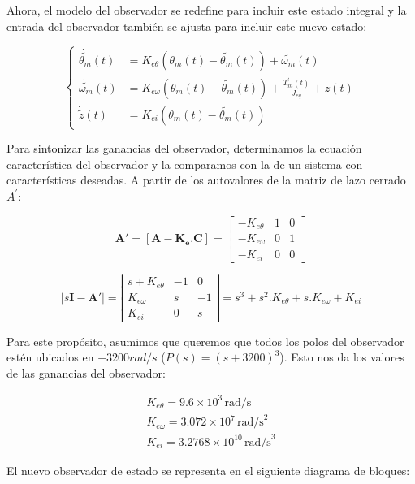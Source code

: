 \documentclass{article}
\begin{document}
Ahora, el modelo del observador se redefine para incluir este estado integral y la entrada del 
observador también se ajusta para incluir este nuevo estado:

\begin{equation}
    \begin{cases}
    \dot{\tilde{\theta_m}}(t) &= K_{e \theta} \left(\theta_m(t) - \tilde{\theta_m}(t)\right) + \tilde{\omega_m}(t) \\
    \dot{\tilde{\omega_m}}(t) &= K_{e \omega} \left(\theta_m(t) - \tilde{\theta_m}(t)\right) + \frac{T_m^\prime(t) }{J_{eq}} + z(t) \\
    \dot{\tilde{z}}(t) &= K_{e i} \left(\theta_m(t) - \tilde{\theta_m}(t)\right)
    \end{cases}
\end{equation}

Para sintonizar las ganancias del observador, determinamos la ecuación característica del 
observador y la comparamos con la de un sistema con características deseadas. A partir de los autovalores 
de la matriz de lazo cerrado $A^\prime$:

\[
\mathbf{A}' = [\mathbf{A} - \mathbf{K_e}.\mathbf{C}] = \begin{bmatrix}
-K_{e\theta} & 1 & 0 \\
-K_{e \omega} & 0 & 1 \\
-K_{e i} & 0 & 0
\end{bmatrix}
\]

\[
\left| s\mathbf{I} - \mathbf{A}' \right| = \left| \begin{array}{ccc}
s + K_{e\theta} & -1 & 0 \\
K_{e \omega} & s & -1 \\
K_{e i} & 0 & s
\end{array} \right| = s^3 + s^2.K_{e \theta} + s.K_{e \omega} + K_{e i}
\]

Para este propósito, 
asumimos que queremos que todos los polos del observador estén ubicados en $-3200 rad/s$ ($ P(s) = (s + 3200)^3 $). Esto nos 
da los valores de las ganancias del observador:

\begin{align*}
    K_{e\theta} = 9.6 \times 10^3 \, \text{rad/s}\\
    K_{e\omega} = 3.072 \times 10^7 \, \text{rad/s}^2\\
    K_{ei} = 3.2768 \times 10^{10} \, \text{rad/s}^3
\end{align*}

El nuevo observador de estado se representa en el siguiente diagrama de bloques:
\end{document}
